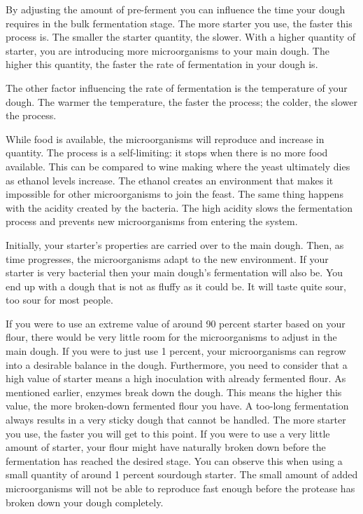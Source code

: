 By adjusting the amount of pre-ferment you can influence the time your dough
requires in the bulk fermentation stage. The more starter you use, the faster
this process is. The smaller the starter quantity, the slower. With a higher
quantity of starter, you are introducing more microorganisms to your main
dough. The higher this quantity, the faster the rate of fermentation in your
dough is.

The other factor influencing the rate of fermentation is the temperature of
your dough. The warmer the temperature, the faster the process; the colder, the
slower the process.

While food is available, the microorganisms will reproduce and increase in
quantity. The process is a self-limiting: it stops when there is no
more food available. This can be compared to wine making where
the yeast ultimately dies as ethanol levels increase. The ethanol creates an
environment that makes it impossible for other
microorganisms to join the feast. The same thing happens with the acidity
created by the bacteria. The high acidity slows the fermentation process and
prevents new microorganisms from entering the system.

Initially, your starter's properties are carried over to the main dough. Then,
as time progresses, the microorganisms adapt to the new environment. If your
starter is very bacterial then your main dough's fermentation will also be. You
end up with a dough that is not as fluffy as it could be. It will taste quite
sour, too sour for most people.

If you were to use an extreme value of around 90 percent starter based on your flour, there
would be very little room for the microorganisms to adjust in the main dough.
If you were to just use 1 percent, your microorganisms can regrow into a
desirable balance in the dough. Furthermore, you need to consider that a high value
of starter means a high inoculation with already fermented flour. As
mentioned earlier, enzymes break down the dough. This means the higher this
value, the more broken-down fermented flour you have. A too-long fermentation
always results in a very sticky dough that cannot be handled. The more
starter you use, the faster you will get to this point. If you were to use a
very little amount of starter, your flour might have naturally broken down
before the fermentation has reached the desired stage. You can observe this
when using a small quantity of around 1 percent sourdough starter. The small
amount of added microorganisms will not be able to reproduce fast enough
before the protease has broken down your dough completely.


